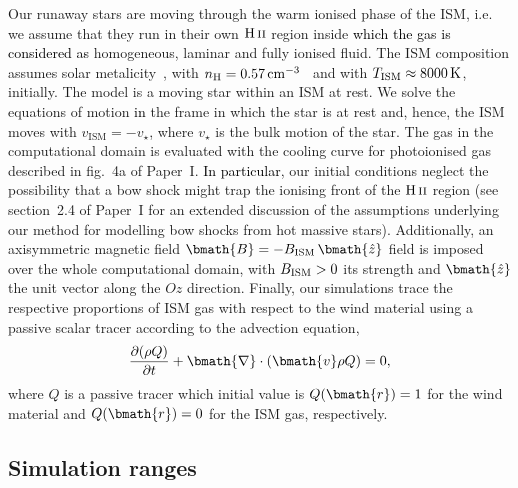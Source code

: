 \documentclass[useAMS,usenatbib]{mn2e}
\def\HII{\rm{H}\,{\textsc {ii}}}
\begin{document}
Our runaway stars are moving through the warm ionised phase of the ISM, i.e.
we assume that they run in their own $\HII$ region inside \textcolor{black}{which the gas is considered 
as} homogeneous, laminar and fully ionised fluid. The ISM composition 
assumes solar metalicity~\citep{lodders_apj_591_2003}, with 
$n_{\rm H}=0.57\, \mathrm{cm}^{-3}$~\citep{wolfire_apj_587_2003} and
with $T_{\rm ISM}\approx 8000\, \rm K$, initially. 
The model is a moving star within an ISM at rest. We solve the equations 
of motion \textcolor{black}{in} the frame in which the star is at rest and, hence, 
the ISM moves with $v_{\mathrm{ISM}}=-v_{\star}$, 
where $v_{\star}$ is the bulk motion of the star. 
The gas in the computational domain is 
evaluated with the cooling curve for photoionised gas described in fig.~4a of Paper~I. 
\textcolor{black}{In particular}, our initial conditions neglect the possibility that a bow shock might trap the ionising front 
of the $\HII$ region (see section~2.4 of Paper~I for an extended discussion of 
the assumptions underlying our method for modelling bow shocks from hot massive stars). 
%
Additionally, an axisymmetric magnetic field $\bmath{B}=-B_{\rm ISM}\, \bmath{\hat{z}}$ field 
is imposed over the whole computational domain, with $B_{\rm ISM}>0$ its 
strength and $\bmath{\hat{z}}$ the unit vector along the $Oz$ direction. Finally, 
our simulations trace the respective proportions of ISM gas with respect to the 
wind material using a passive scalar tracer according to the advection equation,
%
\begin{equation}
	\frac{\partial (\rho Q) }{\partial t } +  \bmath{ \nabla } \cdot  ( \bmath{v} \rho Q) = 0,
\label{eq:tracer}
\end{equation}
%
where $Q$ is a passive tracer which initial value is $Q(\bmath{r})=1$ for the wind material and 
$Q(\bmath{r})=0$ for the ISM gas, respectively.


\subsection{Simulation ranges}
\label{sect:models}
\end{document}
